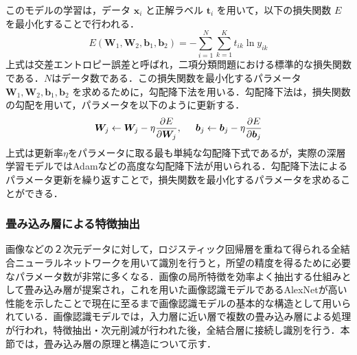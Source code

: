 このモデルの学習は，データ $\bm{x}_i$ と正解ラベル $\bm{t}_i$ を用いて，以下の損失関数 $E$ を最小化することで行われる．
\begin{equation}
    \label{th:lossFunction}
    E(\bm{W}_1,\bm{W}_2,\bm{b}_1,\bm{b}_2) = -\sum_{i=1}^N \sum_{k=1}^K t_{ik} \ln{y_{ik}}
\end{equation}
上式は交差エントロピー誤差と呼ばれ，二項分類問題における標準的な損失関数である．$N$はデータ数である．この損失関数を最小化するパラメータ $\bm{W}_1,\bm{W}_2,\bm{b}_1,\bm{b}_2$ を求めるために，勾配降下法を用いる．勾配降下法は，損失関数の勾配を用いて，パラメータを以下のように更新する．
\begin{equation}
    \bm{W}_j \leftarrow \bm{W}_j - \eta \frac{\partial E}{\partial \bm{W}_j}, \hspace{5mm} \bm{b}_j \leftarrow \bm{b}_j - \eta \frac{\partial E}{\partial \bm{b}_j}
\end{equation}
上式は更新率$\eta $をパラメータに取る最も単純な勾配降下式であるが，実際の深層学習モデルではAdam\cite{kingma2015}などの高度な勾配降下法が用いられる．勾配降下法によるパラメータ更新を繰り返すことで，損失関数を最小化するパラメータを求めることができる．


\subsubsection{畳み込み層による特徴抽出}\label{sec:convolutionalLayer}
画像などの２次元データに対して，ロジスティック回帰層を重ねて得られる全結合ニューラルネットワークを用いて識別を行うと，所望の精度を得るために必要なパラメータ数が非常に多くなる．画像の局所特徴を効率よく抽出する仕組みとして畳み込み層\cite{lecun1998}が提案され，これを用いた画像認識モデルであるAlexNet\cite{krizhevsky2012}が高い性能を示したことで現在に至るまで画像認識モデルの基本的な構造として用いられている．画像認識モデルでは，入力層に近い層で複数の畳み込み層による処理が行われ，特徴抽出・次元削減が行われた後，全結合層に接続し識別を行う．本節では，畳み込み層の原理と構造について示す．

